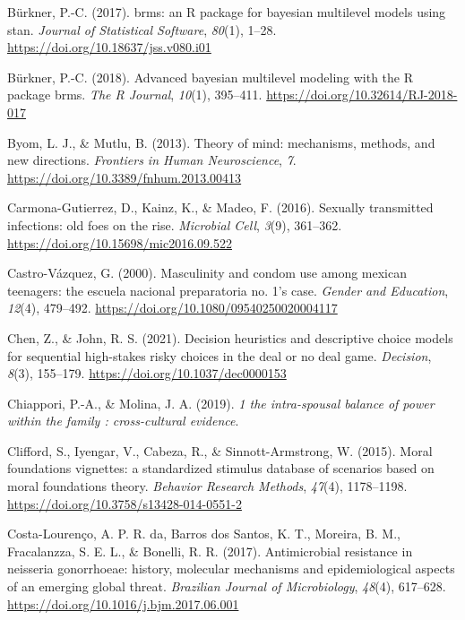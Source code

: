 \documentclass[
  donotrepeattitle,doc, 12pt, a4paper,floatsintext]{apa7}
\newlength{\cslhangindent}
\newlength{\cslentryspacingunit} %
\newenvironment{CSLReferences}[2] %
 {%
  \setlength{\parindent}{0pt}
  \ifodd #1
  \let\oldpar\par
  \def\par{\hangindent=\cslhangindent\oldpar}
  \fi
  \setlength{\parskip}{#2\cslentryspacingunit}
 }%
 {}
\begin{document}
\begin{CSLReferences}{1}{0}
\leavevmode{}%
Bürkner, P.-C. (2017). brms: an R package for bayesian multilevel models using stan. \emph{Journal of Statistical Software}, \emph{80}(1), 1--28. \url{https://doi.org/10.18637/jss.v080.i01}

\leavevmode{}%
Bürkner, P.-C. (2018). Advanced bayesian multilevel modeling with the R package brms. \emph{The R Journal}, \emph{10}(1), 395--411. \url{https://doi.org/10.32614/RJ-2018-017}

\leavevmode{}%
Byom, L. J., \& Mutlu, B. (2013). Theory of mind: mechanisms, methods, and new directions. \emph{Frontiers in Human Neuroscience}, \emph{7}. \url{https://doi.org/10.3389/fnhum.2013.00413}

\leavevmode{}%
Carmona-Gutierrez, D., Kainz, K., \& Madeo, F. (2016). Sexually transmitted infections: old foes on the rise. \emph{Microbial Cell}, \emph{3}(9), 361--362. \url{https://doi.org/10.15698/mic2016.09.522}

\leavevmode{}%
Castro-Vázquez, G. (2000). Masculinity and condom use among mexican teenagers: the escuela nacional preparatoria no. 1's case. \emph{Gender and Education}, \emph{12}(4), 479--492. \url{https://doi.org/10.1080/09540250020004117}

\leavevmode{}%
Chen, Z., \& John, R. S. (2021). Decision heuristics and descriptive choice models for sequential high-stakes risky choices in the deal or no deal game. \emph{Decision}, \emph{8}(3), 155--179. \url{https://doi.org/10.1037/dec0000153}

\leavevmode{}%
Chiappori, P.-A., \& Molina, J. A. (2019). \emph{1 the intra-spousal balance of power within the family : cross-cultural evidence}.

\leavevmode{}%
Clifford, S., Iyengar, V., Cabeza, R., \& Sinnott-Armstrong, W. (2015). Moral foundations vignettes: a standardized stimulus database of scenarios based on moral foundations theory. \emph{Behavior Research Methods}, \emph{47}(4), 1178--1198. \url{https://doi.org/10.3758/s13428-014-0551-2}

\leavevmode{}%
Costa-Lourenço, A. P. R. da, Barros dos Santos, K. T., Moreira, B. M., Fracalanzza, S. E. L., \& Bonelli, R. R. (2017). Antimicrobial resistance in neisseria gonorrhoeae: history, molecular mechanisms and epidemiological aspects of an emerging global threat. \emph{Brazilian Journal of Microbiology}, \emph{48}(4), 617--628. \url{https://doi.org/10.1016/j.bjm.2017.06.001}


\end{CSLReferences}
\end{document}
